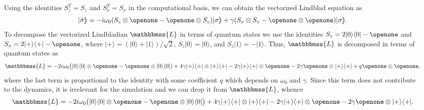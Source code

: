 \documentclass[aps,pra,twocolumn,floatfix,groupedaddress,superscriptaddress,nofootinbib,notitlepage]{revtex4-2}
\def \rrangle{{\rangle\hskip-1mm\rangle}}
\begin{document}
Using the identities $S_{z}^{T}=S_{z}$ and $S_{x}^{T} = S_{x}$ in the computational basis, we can obtain the vectorized Lindblad equation as
\begin{equation}
|\dot{\sigma}\rrangle=-i\omega_{0} (S_{z} \otimes \openone- \openone \otimes S_{z})|\sigma\rrangle + \gamma (S_{x} \otimes S_{x}-\openone\otimes \openone)|\sigma\rrangle. 
\label{nu-dyn}
\end{equation}
To decompose the vectorized Lindbladian $\mathbbmss{L}$ in terms of quantum states we use the identities $S_{z}=2 |0\rangle\langle 0|-\openone$ and $S_{x} = 2 |+\rangle\langle +|-\openone$, where $ |+\rangle = (|0\rangle + |1\rangle)/\sqrt{2}$, $S_{z} |0\rangle=|0\rangle$, and $S_{z} |1\rangle = -|1\rangle$. Thus, $\mathbbmss{L}$ is decomposed in terms of quantum states as 
\begin{equation}
 \mathbbmss{L}=-2i\omega_{0} \big(|0\rangle\langle 0| \otimes \openone- \openone \otimes |0\rangle\langle 0|)+ 4\gamma |+\rangle\langle +|\otimes |+\rangle\langle +|- 2\gamma |+\rangle\langle +| \otimes \openone-2\gamma \openone \otimes |+\rangle\langle +| + q \openone \otimes\openone, 
\end{equation}
where the last term is proportional to the identity with some coefficient $q$ which depends on $\omega_{0}$ and $\gamma$. Since this term does not contribute to the dynamics, it is irrelevant for the simulation and we can drop it from $ \mathbbmss{L}$, whence
\begin{equation}
\mathbbmss{L}=-2i\omega_{0} \big(|0\rangle\langle 0| \otimes \openone- \openone \otimes |0\rangle\langle 0|\big)+ 4\gamma |+\rangle\langle +|\otimes |+\rangle \langle +| - 2\gamma  |+\rangle\langle +| \otimes \openone-2\gamma \openone \otimes |+ \rangle \langle +|.
\end{equation}
 
\end{document}
